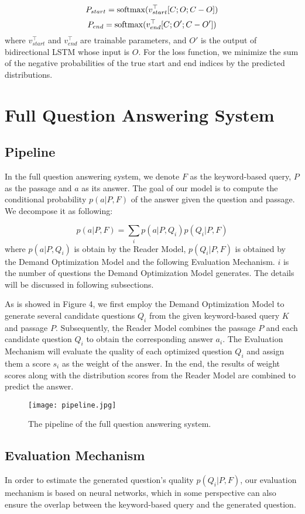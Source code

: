 \documentclass[sigconf]{acmart}
\begin{document}
$$P_{start} = {\rm softmax}(v^{\top}_{start}[C;O;C-O])$$
$$P_{end} = {\rm softmax}(v^{\top}_{end}[C;O';C-O'])$$
where $v^{\top}_{start}$ and $v^{\top}_{end}$ are trainable parameters, and $O'$ is the output of bidirectional LSTM whose input is $O$. For the loss function, we minimize the sum of the negative probabilities of the true start and end indices by the predicted distributions.




\section{Full Question Answering System}
\subsection{Pipeline}
In the full question answering system, we denote $F$ as the keyword-based query, $P$ as the passage and $a$ as its answer. The goal of our model is to compute the conditional probability $p(a|P,F)$ of the answer given the question and passage. We decompose it as following:

$$p(a|P,F) = \sum_{i}p(a|P,Q_i)p(Q_i | P, F)$$
where $p(a|P,Q_i)$ is obtain by the Reader Model, $p(Q_i | P, F)$ is obtained by the Demand Optimization Model and the following Evaluation Mechanism. $i$ is the number of questions the Demand Optimization Model generates. The details will be discussed in following subsections.

As is showed in Figure 4, we first employ the Demand Optimization Model to generate several candidate questions $Q_i$ from the given keyword-based query $K$ and passage $P$. Subsequently, the Reader Model combines the passage $P$ and each candidate question $Q_i$ to obtain the corresponding answer $a_i$. The Evaluation Mechanism will evaluate the quality of each optimized question $Q_i$ and assign them a score $s_i$ as the weight of the answer. In the end, the results of weight scores along with the distribution scores from the Reader Model are combined to predict the answer.

\begin{figure}[t]
  \begin{center}
  \texttt{[image: pipeline.jpg]}
  \caption{The pipeline of the full question answering system.}
  \end{center}
\end{figure}


\subsection{Evaluation Mechanism}
In order to estimate the generated question's quality $p(Q_i | P, F)$, our evaluation mechanism is based on neural networks, which in some perspective can also ensure the overlap between the keyword-based query and the generated question.
\end{document}
